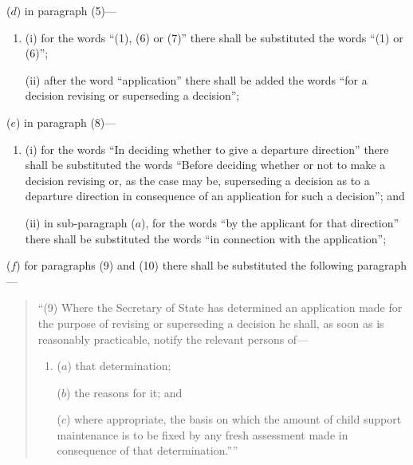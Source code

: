 \documentclass[12pt,a4paper]{article}
\begin{document}
\begin{enumerate}
($d$) in paragraph (5)---
\begin{enumerate}\item[]
(i) for the words “(1), (6) or (7)” there shall be substituted the words “(1) or (6)”;

(ii) after the word “application” there shall be added the words “for a decision revising or superseding a decision”;
\end{enumerate}

($e$) in paragraph (8)---
\begin{enumerate}\item[]
(i) for the words “In deciding whether to give a departure direction” there shall be substituted the words “Before deciding whether or not to make a decision revising or, as the case may be, superseding a decision as to a departure direction in consequence of an application for such a decision”; and

(ii) in sub-paragraph ($a$), for the words “by the applicant for that direction” there shall be substituted the words “in connection with the application”;
\end{enumerate}

($f$) for paragraphs (9) and (10) there shall be substituted the following paragraph---
\begin{quotation}
“(9) Where the Secretary of State has determined an application made for the purpose of revising or superseding a decision he shall, as soon as is reasonably practicable, notify the relevant persons of---
\begin{enumerate}\item[]
($a$) that determination;

($b$) the reasons for it; and

($c$) where appropriate, the basis on which the amount of child support maintenance is to be fixed by any fresh assessment made in consequence of that determination.””
\end{enumerate}
\end{quotation}
\end{enumerate}

\end{document}
